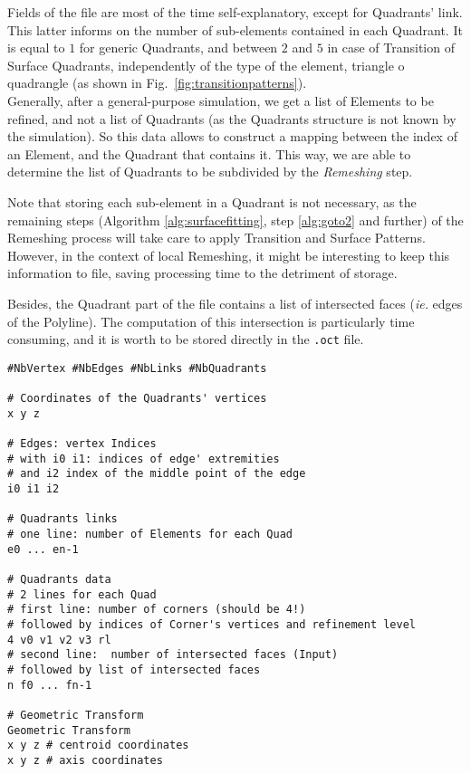 \documentclass[10pt]{article}
\begin{document}
Fields of the file are most of the time self-explanatory, except for Quadrants' link. This latter informs on the number of sub-elements contained in each Quadrant. It is equal to $1$ for generic Quadrants, and between $2$ and $5$ in case of Transition of Surface Quadrants, independently of the type of the element, triangle o quadrangle (as shown in Fig.~\ref{fig:transitionpatterns}). \\
Generally, after a general-purpose simulation, we get a list of Elements to be refined, and not a list of Quadrants (as the Quadrants structure is not known by the simulation). So this data allows to construct a mapping between the index of an Element, and the Quadrant that contains it. This way, we are able to determine the list of Quadrants to be subdivided by the \textit{Remeshing} step.

Note that storing each sub-element in a Quadrant is not necessary, as the remaining steps (Algorithm \ref{alg:surfacefitting}, step \ref{alg:goto2} and further) of the Remeshing process will take care to apply Transition and Surface Patterns.
However, in the context of local Remeshing, it might be interesting to keep this information to file, saving processing time to the detriment of storage.

Besides, the Quadrant part of the file contains a list of intersected faces (\textit{ie.} edges of the Polyline). The computation of this intersection is particularly time consuming, and it is worth to be stored directly in the \texttt{.oct} file.

\begin{tcolorbox}[skin=enhanced,breakable]
\begin{verbatim}
#NbVertex #NbEdges #NbLinks #NbQuadrants

# Coordinates of the Quadrants' vertices
x y z

# Edges: vertex Indices
# with i0 i1: indices of edge' extremities
# and i2 index of the middle point of the edge
i0 i1 i2

# Quadrants links
# one line: number of Elements for each Quad
e0 ... en-1

# Quadrants data
# 2 lines for each Quad
# first line: number of corners (should be 4!)
# followed by indices of Corner's vertices and refinement level 
4 v0 v1 v2 v3 rl
# second line:  number of intersected faces (Input)
# followed by list of intersected faces
n f0 ... fn-1

# Geometric Transform
Geometric Transform
x y z # centroid coordinates
x y z # axis coordinates
\end{verbatim}
\end{tcolorbox}
\end{document}
